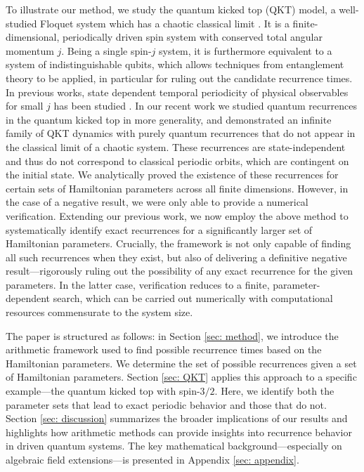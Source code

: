 \documentclass[a4paper,onecolumn,accepted=2026-04-08,10pt]{quantumarticle}
\theoremstyle{definition}
\begin{document}
To illustrate our method, we study the quantum kicked top (QKT) model, a well-studied Floquet system which has a chaotic classical limit \cite{haake_1987}. It is a finite-dimensional, periodically driven spin system with conserved total angular momentum $j$. Being a single spin-$j$ system, it is furthermore equivalent to a system of indistinguishable qubits, which allows techniques from entanglement theory to be applied, in particular for ruling out the candidate recurrence times.  In previous works, state dependent temporal periodicity of physical observables for small $j$ has been studied  \cite{Ruebeck_Pattanayak_2017,Bhosale_Santhanam_periodicity_2018,Dogra_exactly_2019,bhosle_qkt__jan_2024,bhosle_nov_2024,bhosle_qkt_aug_2024}. In our recent work \cite{anand_davis_ghose_2024} we studied quantum recurrences in the quantum kicked top in more generality, and demonstrated an infinite family of QKT dynamics with purely quantum recurrences that do not appear in the classical limit of a chaotic system. These recurrences are state-independent and thus do not correspond to classical periodic orbits, which are contingent on the initial state. We analytically proved the existence of these recurrences for certain sets of Hamiltonian parameters across all finite dimensions. However, in the case of a negative result, we were only able to provide a numerical verification.
Extending our previous work, we now employ the above method to systematically identify exact recurrences for a significantly larger set of Hamiltonian parameters. Crucially, the framework is not only capable of finding all such recurrences when they exist, but also of delivering a definitive negative result—rigorously ruling out the possibility of any exact recurrence for the given parameters. In the latter case, verification reduces to a finite, parameter-dependent search, which can be carried out numerically with computational resources commensurate to the system size.


The paper is structured as follows: in Section \ref{sec: method}, we introduce the arithmetic framework used to find possible recurrence times based on the Hamiltonian parameters. We determine the set of possible recurrences given a set of Hamiltonian parameters. Section \ref{sec: QKT} applies this approach to a specific example—the quantum kicked top with spin-$3/2$. Here, we identify both the parameter sets that lead to exact periodic behavior and those that do not. Section  \ref{sec: discussion} summarizes the broader implications of our results and highlights how arithmetic methods can provide insights into recurrence behavior in driven quantum systems. The key mathematical background—especially on algebraic field extensions—is presented in Appendix \ref{sec: appendix}.
\end{document}
